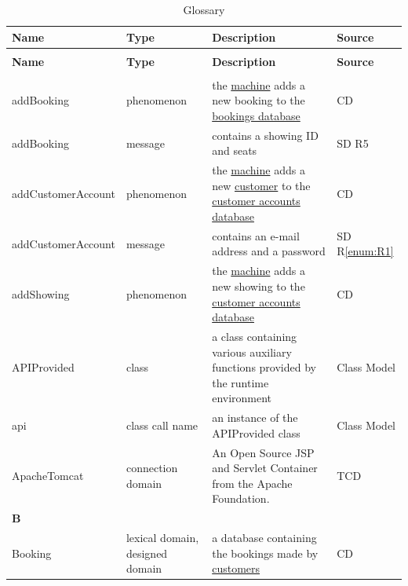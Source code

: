 \documentclass[a4paper,10pt,titlepage,bibtotoc,bibtotocnumbered]{scrreprt}
\begin{document}
\begin{longtable}{|p{4cm}|p{3cm}|p{5cm}|l|}
\caption{Glossary}
\label{table:glossar}\\
\hline
\rowcolor{black!25}\textbf{Name} & \textbf{Type} & \textbf{Description} & \textbf{Source}\\
\hline
\endfirsthead
\caption[]{Glossary}\\
\hline
\rowcolor{black!25}\textbf{Name} & \textbf{Type} & \textbf{Description} & \textbf{Source}\\
\endhead
\hline
\endfoot
\multicolumn{4}{|l|}{\textbf{A}}\\
\hline
\hypertarget{glossary:addBooking}{addBooking} & phenomenon & the \hyperlink{glossary:UDEKino}{machine} adds a new booking to the \hyperlink{glossary:Booking}{bookings database} & CD\\
\hline
addBooking & message & contains a showing ID and seats & SD R5\\
\hline
\hypertarget{glossary:addCustomerAccount}{addCustomerAccount} & phenomenon & the \hyperlink{glossary:UDEKino}{machine} adds a new \hyperlink{glossary:Customer}{customer} to the \hyperlink{glossary:CustomerAccount}{customer accounts database} & CD\\
\hline
addCustomerAccount & message & contains an e-mail address and a password & SD R\ref{enum:R1}\\
\hline
\hypertarget{glossary:addShowing}{addShowing} & phenomenon & the \hyperlink{glossary:UDEKino}{machine} adds a new showing to the \hyperlink{glossary:ShowingsDatabase}{customer accounts database} & CD\\
\hline
APIProvided & class & a class containing various auxiliary functions provided by the runtime environment & Class Model\\
\hline
api & class call name & an instance of the APIProvided class & Class Model\\
\hline
ApacheTomcat & connection domain & An Open Source JSP and Servlet Container from the Apache Foundation. & TCD\\
\hline
\multicolumn{4}{|l|}{\textbf{B}}\\
\hline
\hypertarget{glossary:Booking}{Booking} & lexical domain, designed domain & a database containing the bookings made by \hyperlink{glossary:Customer}{customers} & CD\\

\end{longtable}
\end{document}
